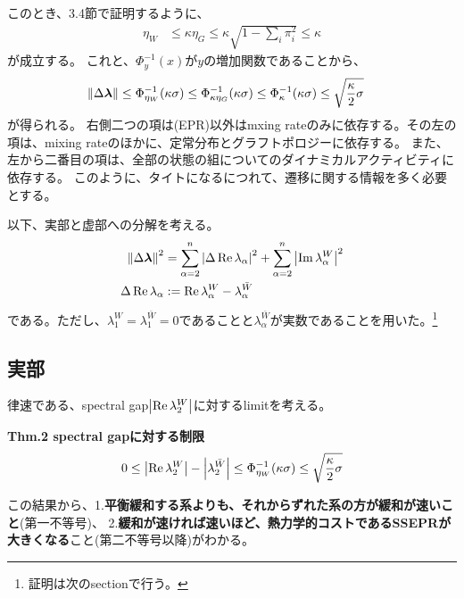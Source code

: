 \documentclass[a4paper,11pt]{jsarticle}
\numberwithin{equation}{section}
\begin{document}
このとき、3.4節で証明するように、
\begin{align}
    \eta_{W} &\leq \kappa \eta_{G} \leq \kappa \sqrt{1- \sum_{i} \pi_i^2} \leq \kappa \label{eq:eta_ineq}
\end{align}
が成立する。
これと、$\Phi^{-1}_{y}(x)$が$y$の増加関数であることから、
\begin{align}
    \norm{\Delta \bm{\lambda}} &\leq \Phi_{\eta_{W}}^{-1}(\kappa \sigma) \leq \Phi_{\kappa\eta_{G}}^{-1}(\kappa \sigma) \leq \Phi_{\kappa}^{-1}(\kappa \sigma) \leq \sqrt{\frac{\kappa}{2} \sigma}
\end{align}
が得られる。
右側二つの項は(EPR)以外はmxing rateのみに依存する。その左の項は、mixing rateのほかに、定常分布とグラフトポロジーに依存する。
また、左から二番目の項は、全部の状態の組についてのダイナミカルアクティビティに依存する。
このように、タイトになるにつれて、遷移に関する情報を多く必要とする。

以下、実部と虚部への分解を考える。
\begin{align}
    \norm{\Delta \bm{\lambda}} ^2 &= \sum_{\alpha=2}^n \abs{\Delta \Re \lambda_{\alpha}}^2 + \sum_{\alpha=2}^n \abs{\Im \lambda_{\alpha}^{W}}^2\\
    \Delta \Re \lambda_{\alpha} &:= \Re \lambda_{\alpha}^W - \lambda_{\alpha}^{\bar{W}}
\end{align}
である。ただし、$\lambda_1^{W} = \lambda_1^{\bar{W}}=0$であることと$\lambda_{\alpha}^{\bar{W}}$が実数であることを用いた。\footnote{証明は次のsectionで行う。}

\subsection{実部}
律速である、spectral gap$\abs{\Re \lambda_2^W}$に対するlimitを考える。
\begin{itembox}[l]{\textbf{Thm.2 spectral gapに対する制限}}
    \begin{align}
        0 \leq \abs{\Re \lambda_2^W} - \abs{\lambda_2^{\bar{W}}} \leq \Phi_{\eta_{W}}^{-1}(\kappa \sigma) \leq \sqrt{\frac{\kappa}{2} \sigma} \label{eq:thm2}
    \end{align}
\end{itembox}
この結果から、1.\textbf{平衡緩和する系よりも、それからずれた系の方が緩和が速いこと}(第一不等号)、
2.\textbf{緩和が速ければ速いほど、熱力学的コストであるSSEPRが大きくなる}こと(第二不等号以降)がわかる。
\end{document}
